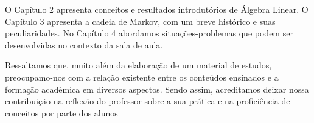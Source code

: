 O Capítulo 2 apresenta conceitos e resultados introdutórios de Álgebra Linear. O Capítulo
3 apresenta a cadeia de Markov, com um breve histórico e suas peculiaridades. No Capítulo 4
abordamos situações-problemas que podem ser desenvolvidas no contexto da sala de aula.

Ressaltamos que, muito além da elaboração de um material de estudos, preocupamo-nos
com a relação existente entre os conteúdos ensinados e a formação acadêmica em diversos
aspectos. Sendo assim, acreditamos deixar nossa contribuição na reflexão do professor sobre a
sua prática e na proficiência de conceitos por parte dos alunos